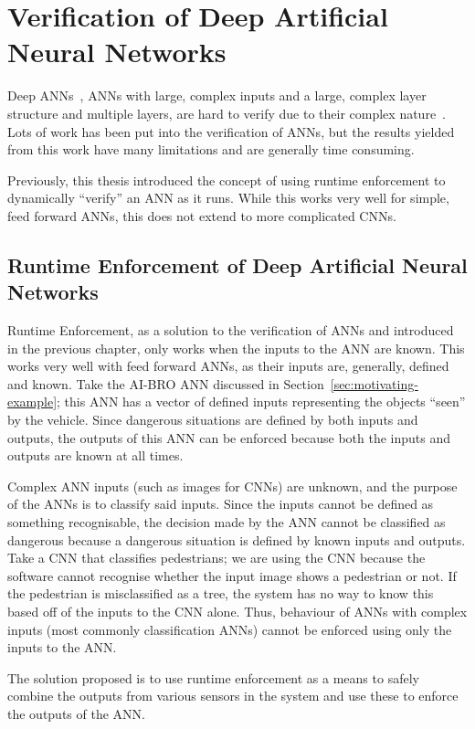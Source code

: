 \section{Verification of Deep Artificial Neural Networks}
Deep \acfp{ANN}~\cite{schmidhuber2015deep}, \acp{ANN} with large, complex inputs and a large, complex layer structure and multiple layers, are hard to verify due to their complex nature~\cite{Gehr2018AI2SA}. 
Lots of work has been put into the verification of \acp{ANN}, but the results yielded from this work have many limitations and are generally time consuming.

Previously, this thesis introduced the concept of using runtime enforcement to dynamically ``verify'' an \ac{ANN} as it runs. 
While this works very well for simple, feed forward \acp{ANN}, this does not extend to more complicated \acp{CNN}.

\subsection{Runtime Enforcement of Deep Artificial Neural Networks}
Runtime Enforcement, as a solution to the verification of \acp{ANN} and introduced in the previous chapter, only works when the inputs to the \ac{ANN} are known.
This works very well with feed forward \acp{ANN}, as their inputs are, generally, defined and known.
Take the AI-BRO \ac{ANN} discussed in Section~\ref{sec:motivating-example}; this \ac{ANN} has a vector of defined inputs representing the objects ``seen'' by the vehicle.
Since dangerous situations are defined by both inputs and outputs, the outputs of this \ac{ANN} can be enforced because both the inputs and outputs are known at all times.

Complex \ac{ANN} inputs (such as images for \acp{CNN}) are unknown, and the purpose of the \acp{ANN} is to classify said inputs.
Since the inputs cannot be defined as something recognisable, the decision made by the \ac{ANN} cannot be classified as dangerous because a dangerous situation is defined by known inputs and outputs.
Take a \ac{CNN} that classifies pedestrians; we are using the \ac{CNN} because the software cannot recognise whether the input image shows a pedestrian or not.
If the pedestrian is misclassified as a tree, the system has no way to know this based off of the inputs to the \ac{CNN} alone.
Thus, behaviour of \acp{ANN} with complex inputs (most commonly classification \acp{ANN}) cannot be enforced using only the inputs to the \ac{ANN}.

The solution proposed is to use runtime enforcement as a means to safely combine the outputs from various sensors in the system and use these to enforce the outputs of the \ac{ANN}.


